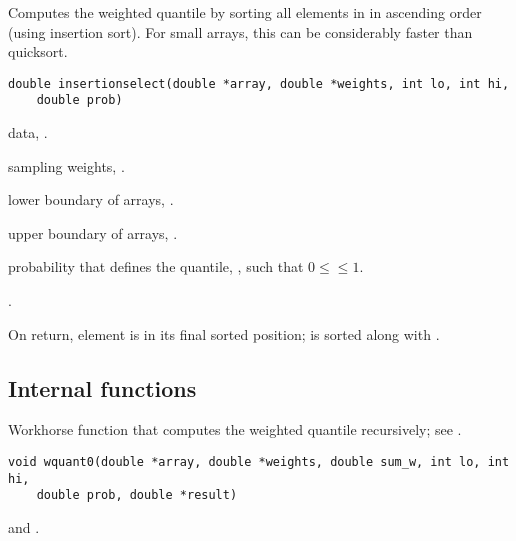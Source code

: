 \documentclass[a4paper,oneside,10pt,DIV=12]{scrartcl}
\def\DATA#1#2#3{
	\item[\code{#1}] #2, \code{double array[#3]}.}
\def\WEIGHTS#1{
	\item[\code{#1}] sampling weights, \code{double array[n]}.
}
\begin{document}
\begin{Description}
Computes the weighted quantile by sorting all elements in  in
ascending order (using insertion sort). For small arrays, this can be
considerably faster than quicksort.
\end{Description}
\begin{Usage}
\begin{verbatim}
double insertionselect(double *array, double *weights, int lo, int hi,
    double prob)
\end{verbatim}
\end{Usage}
\begin{Arguments}
	\begin{ldescription}
		\DATA{array}{data}{n}
		\WEIGHTS{weights}
		\item[\code{lo}] lower boundary of arrays, \code{[int]}.
		\item[\code{hi}] upper boundary of arrays, \code{[int]}.
		\item[\code{prob}] probability that defines the quantile,
			, such that $0 \leq$$\leq 1$.
	\end{ldescription}
\end{Arguments}
\begin{Dependency}
.
\end{Dependency}
\begin{Value}
On return, element  is in its final sorted position;
 is sorted along with .
\end{Value}

\clearpage
\subsection*{Internal functions}
%

\begin{Description}
Workhorse function that computes the weighted quantile recursively; see
.
\end{Description}
\begin{Usage}
\begin{verbatim}
void wquant0(double *array, double *weights, double sum_w, int lo, int hi,
    double prob, double *result)
\end{verbatim}
\end{Usage}
\begin{Dependencies}
	 and
	.
\end{Dependencies}
\end{document}
